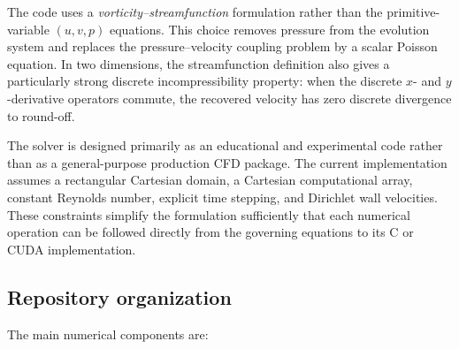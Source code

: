 \documentclass[11pt,a4paper]{article}
\begin{document}
The code uses a \emph{vorticity--streamfunction} formulation rather than the primitive-variable $(u,v,p)$ equations.  This choice removes pressure from the evolution system and replaces the pressure--velocity coupling problem by a scalar Poisson equation.  In two dimensions, the streamfunction definition also gives a particularly strong discrete incompressibility property: when the discrete $x$- and $y$-derivative operators commute, the recovered velocity has zero discrete divergence to round-off.

The solver is designed primarily as an educational and experimental code rather than as a general-purpose production CFD package.  The current implementation assumes a rectangular Cartesian domain, a Cartesian computational array, constant Reynolds number, explicit time stepping, and Dirichlet wall velocities.  These constraints simplify the formulation sufficiently that each numerical operation can be followed directly from the governing equations to its C or CUDA implementation.

\subsection{Repository organization}

The main numerical components are:
\end{document}
